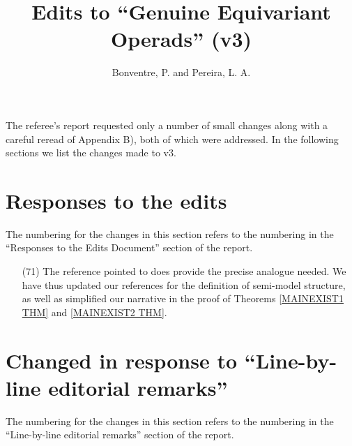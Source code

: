 \documentclass{article}
\begin{document}
 
 
\title{Edits to ``Genuine Equivariant Operads'' (v3)
\\[12pt]} %
 
\author{Bonventre, P. and Pereira, L. A.}
 
\maketitle

The referee's report requested only a number of small changes along with a careful reread of Appendix B),
both of which were addressed. In the following sections we list the changes made to v3.

\section{Responses to the edits}

The numbering for the changes in this section refers to the numbering in the ``Responses to the Edits Document'' section of the report.

\begin{itemize}
\item[(71)] The reference pointed to does provide the precise analogue needed.
        We have thus updated our references for the definition of semi-model structure,
        as well as simplified our narrative in the proof of Theorems \ref{MAINEXIST1 THM} and \ref{MAINEXIST2 THM}.
\end{itemize}

\section{Changed in response to ``Line-by-line editorial remarks''}

The numbering for the changes in this section refers to the numbering in the ``Line-by-line editorial remarks'' section of the report.
\end{document}
